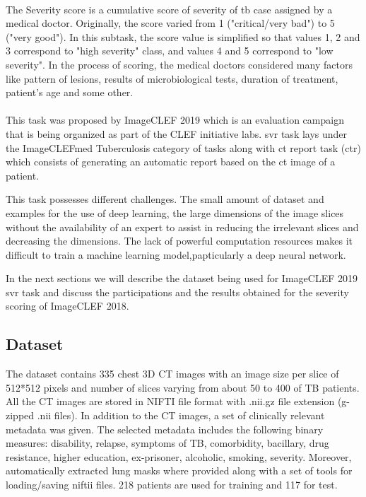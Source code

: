 \paragraph{}
The Severity score is a cumulative score of severity of \acs{tb} case assigned by a medical doctor. Originally, the score varied from 1 ("critical/very bad") to 5 ("very good"). In this subtask, the score value is simplified so that values 1, 2 and 3 correspond to "high severity" class, and values 4 and 5 correspond to "low severity". In the process of scoring, the medical doctors considered many factors like pattern of lesions, results of microbiological tests, duration of treatment, patient's age and some other.
\paragraph{}
This task was proposed by ImageCLEF 2019 which is an evaluation campaign that is being organized as part of the CLEF initiative labs. \acs{svr} task lays under the ImageCLEFmed Tuberculosis category of tasks along with \acs{ct} report task (\acs{ctr}) which consists of generating an automatic report based on the \acs{ct} image of a patient.

This task possesses different challenges. The small amount of dataset and examples for the use of deep learning, the large dimensions of the image slices without the availability of an expert to assist in reducing the irrelevant slices and decreasing the dimensions. The lack of powerful computation resources makes it difficult to train a machine learning model,papticularly a deep neural network.

In the next sections we will describe the dataset being used for ImageCLEF 2019 \acs{svr} task and discuss the participations and the results obtained for the severity scoring of ImageCLEF 2018.
\subsection{Dataset}
The dataset contains 335 chest 3D CT images with an image size per slice of 512*512 pixels and number of slices varying from about 50 to 400 of TB patients. All the CT images are stored in NIFTI file format with .nii.gz file extension (g-zipped .nii files). In addition to the CT images, a set of clinically relevant metadata was given. The selected metadata includes the following binary measures: disability, relapse, symptoms of TB, comorbidity, bacillary, drug resistance, higher education, ex-prisoner, alcoholic, smoking, severity. Moreover, automatically extracted lung masks where provided along with a set of tools for loading/saving niftii files. 218 patients are used for training and 117 for test.
